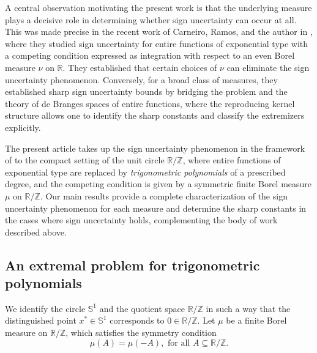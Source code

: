 \documentclass[reqno, a4paper]{amsart}
\def\R{\mathbb{R}}
\def\SS{\mathbb{S}}
\def\T{\mathbb{R}/\mathbb{Z}}
\theoremstyle{plain}
\theoremstyle{definition}
\theoremstyle{remarkstyle}
\numberwithin{equation}{section}
\begin{document}
\smallskip
 
A central observation motivating the present work is that the underlying measure plays a decisive role in determining whether sign uncertainty can occur at all. This was made precise in the recent work of Carneiro, Ramos, and the author in \cite{Carneiro2024SignUncertaintyBrangesSpaces}, where they studied sign uncertainty for entire functions of exponential type with a competing condition expressed as integration with respect to an even Borel measure $\nu$ on $\R$. They established that certain choices of $\nu$ can eliminate the sign uncertainty phenomenon. Conversely, for a broad class of measures, they established sharp sign uncertainty bounds by bridging the problem and the theory of de Branges spaces of entire functions, where the reproducing kernel structure allows one to identify the sharp constants and classify the extremizers explicitly. 

\smallskip

The present article takes up the sign uncertainty phenomenon in the framework of \cite{Carneiro2024SignUncertaintyBrangesSpaces} to the compact setting of the unit circle $\T$, where entire functions of exponential type are replaced by \emph{trigonometric polynomials} of a prescribed degree, and the competing condition is given by a symmetric finite Borel measure $\mu$ on $\T$. Our main results provide a complete characterization of the sign uncertainty phenomenon for each measure and determine the sharp constants in the cases where sign uncertainty holds, complementing the body of work described above.


\subsection{An extremal problem for trigonometric polynomials} 

We identify the circle $\SS^1$ and the quotient space $\T$ in such a way that the distinguished point $x^\ast\in\SS^1$ corresponds to $0\in \T$. Let $\mu$ be a finite Borel measure on $\T$, which satisfies the symmetry condition
\begin{equation}\label{eq:symmetry-condition}
    \mu(A)=\mu(-A), \text{ for all } A\subseteq \T.
\end{equation}
\end{document}

